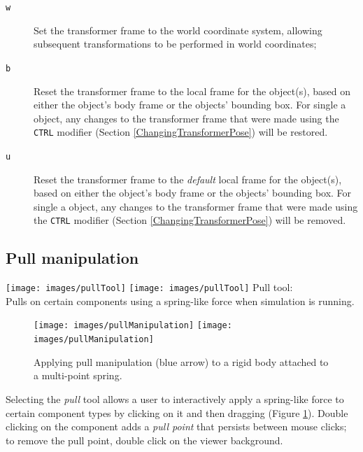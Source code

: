 \documentclass{article}
\begin{document}
\begin{description}

\item[{\tt w}]\mbox{}

Set the transformer frame to the world coordinate system, allowing
subsequent transformations to be performed in world coordinates;

\item[{\tt b}]\mbox{}

Reset the transformer frame to the local frame for the object(s),
based on either the object's body frame or the objects' bounding box.
For single a object, any changes to the transformer frame that were
made using the {\tt CTRL} modifier (Section
\ref{ChangingTransformerPose}) will be restored.

\item[{\tt u}]\mbox{}

Reset the transformer frame to the {\it default} local frame for the
object(s), based on either the object's body frame or the objects'
bounding box.  For single a object, any changes to the transformer
frame that were made using the {\tt CTRL} modifier (Section
\ref{ChangingTransformerPose}) will be removed.

\end{description}

\subsection{Pull manipulation}
\label{PullControllerSec}

\vspace{\parskip}
\iflatexml
\phantom{.}\texttt{[image: images/pullTool]}
\else
\texttt{[image: images/pullTool]}
\fi
{\sf Pull tool:}\\
Pulls on certain components using a spring-like force
when simulation is running.

\begin{figure}[h]
\begin{center}
\iflatexml
\texttt{[image: images/pullManipulation]}
\else
\texttt{[image: images/pullManipulation]}
\fi
\end{center}
\caption{Applying pull manipulation (blue arrow) to a rigid body 
attached to a multi-point spring.}%
\label{PullManipulationFig}
\end{figure}

Selecting the {\it pull} tool allows a user to interactively apply a
spring-like force to certain component types by clicking on it and
then dragging (Figure \ref{PullManipulationFig}). Double clicking on
the component adds a {\it pull point} that persists between mouse
clicks; to remove the pull point, double click on the viewer
background.
\end{document}
